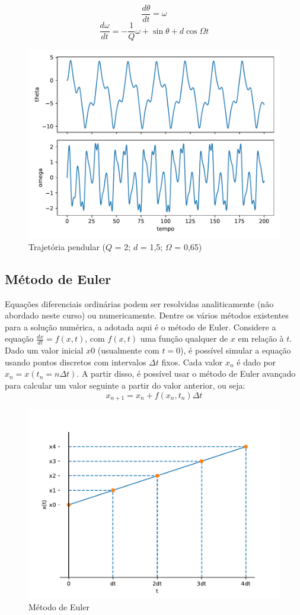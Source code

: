 $$
\frac{d\theta}{dt} = \omega
$$$$
\frac{d\omega}{dt} = -\frac{1}{Q}\omega + \sin{\theta} + d\cos{\Omega t}
$$

\begin{figure}[htb!]
	\centering
	\caption[Trajetória pendular]{Trajetória pendular ($Q$ = 2; $d$ = 1,5; $\Omega$ = 0,65)}
	\label{fig:pendulo}
	\includegraphics[width=0.7\linewidth]{figs/pendulo}
\end{figure}

\subsection{Método de Euler}
Equações diferenciais ordinárias podem ser resolvidas analiticamente (não abordado neste curso) ou numericamente. Dentre os vários métodos existentes para a solução numérica, a adotada aqui é o método de Euler. Considere a equação $\frac{dx}{dt}=f(x,t)$, com $f(x,t)$ uma função qualquer de $x$ em relação à $t$. Dado um valor inicial $x0$ (usualmente com $t=0$), é possível simular a equação usando pontos discretos com intervalos $\Delta t$ fixos. Cada valor $x_n$ é dado por $x_n=x(t_n=n\Delta t)$. A partir disso, é possível usar o método de Euler avançado para calcular um valor seguinte a partir do valor anterior, ou seja:
$$
x_{n+1}=x_n+f(x_n,t_n)\Delta t
$$

\begin{figure}[htb!]
	\centering
	\caption{Método de Euler}
	\label{fig:euler}
	\includegraphics[width=0.7\linewidth]{figs/euler}
\end{figure}

